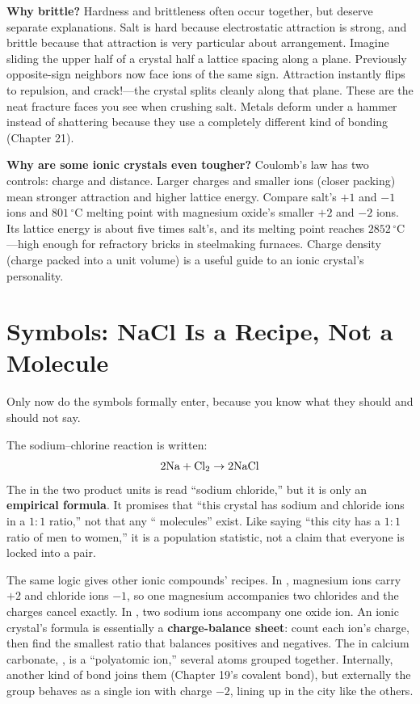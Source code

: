 \textbf{Why brittle?} Hardness and brittleness often occur together, but deserve separate explanations. Salt is hard because electrostatic attraction is strong, and brittle because that attraction is very particular about arrangement. Imagine sliding the upper half of a crystal half a lattice spacing along a plane. Previously opposite-sign neighbors now face ions of the same sign. Attraction instantly flips to repulsion, and crack!---the crystal splits cleanly along that plane. These are the neat fracture faces you see when crushing salt. Metals deform under a hammer instead of shattering because they use a completely different kind of bonding (Chapter 21).

\textbf{Why are some ionic crystals even tougher?} Coulomb's law has two controls: charge and distance. Larger charges and smaller ions (closer packing) mean stronger attraction and higher lattice energy. Compare salt's $+1$ and $-1$ ions and $801\,^{\circ}\mathrm{C}$ melting point with magnesium oxide's smaller $+2$ and $-2$ ions. Its lattice energy is about five times salt's, and its melting point reaches $2852\,^{\circ}\mathrm{C}$---high enough for refractory bricks in steelmaking furnaces. Charge density (charge packed into a unit volume) is a useful guide to an ionic crystal's personality.

\section{Symbols: NaCl Is a Recipe, Not a Molecule}

Only now do the symbols formally enter, because you know what they should and should not say.

The sodium--chlorine reaction is written:
\[\mathrm{2Na} + \mathrm{Cl_2} \rightarrow \mathrm{2NaCl}\]
The  in the two product units is read ``sodium chloride,'' but it is only an \textbf{empirical formula}. It promises that ``this crystal has sodium and chloride ions in a $1:1$ ratio,'' not that any `` molecules'' exist. Like saying ``this city has a $1:1$ ratio of men to women,'' it is a population statistic, not a claim that everyone is locked into a pair.

The same logic gives other ionic compounds' recipes. In , magnesium ions carry $+2$ and chloride ions $-1$, so one magnesium accompanies two chlorides and the charges cancel exactly. In , two sodium ions accompany one oxide ion. An ionic crystal's formula is essentially a \textbf{charge-balance sheet}: count each ion's charge, then find the smallest ratio that balances positives and negatives. The  in calcium carbonate, , is a ``polyatomic ion,'' several atoms grouped together. Internally, another kind of bond joins them (Chapter 19's covalent bond), but externally the group behaves as a single ion with charge $-2$, lining up in the city like the others.

